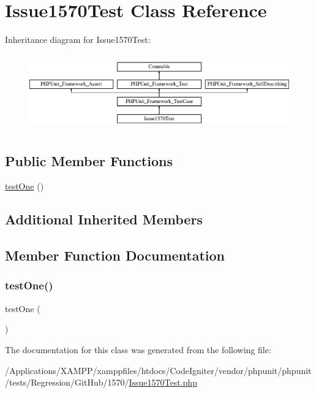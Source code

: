 \hypertarget{class_issue1570_test}{}\section{Issue1570\+Test Class Reference}
\label{class_issue1570_test}
Inheritance diagram for Issue1570\+Test\+:\begin{figure}[H]
\begin{center}
\leavevmode
\includegraphics[height=3.303835cm]{class_issue1570_test}
\end{center}
\end{figure}
\subsection*{Public Member Functions}
\begin{DoxyCompactItemize}
\item 
\mbox{\hyperlink{class_issue1570_test_afbf3ff88b322c6a7197ce02297cd23a0}{test\+One}} ()
\end{DoxyCompactItemize}
\subsection*{Additional Inherited Members}


\subsection{Member Function Documentation}
\mbox{\label{class_issue1570_test_afbf3ff88b322c6a7197ce02297cd23a0}} 
\subsubsection{\texorpdfstring{test\+One()}{testOne()}}
{\footnotesize\ttfamily test\+One (\begin{DoxyParamCaption}{ }\end{DoxyParamCaption})}



The documentation for this class was generated from the following file\+:\begin{DoxyCompactItemize}
\item 
/\+Applications/\+X\+A\+M\+P\+P/xamppfiles/htdocs/\+Code\+Igniter/vendor/phpunit/phpunit/tests/\+Regression/\+Git\+Hub/1570/\mbox{\hyperlink{_issue1570_test_8php}{Issue1570\+Test.\+php}}\end{DoxyCompactItemize}
